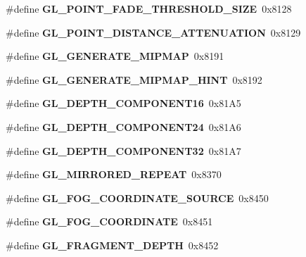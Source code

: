 \begin{DoxyCompactItemize}
\item 
\#define {\bfseries G\+L\+\_\+\+P\+O\+I\+N\+T\+\_\+\+F\+A\+D\+E\+\_\+\+T\+H\+R\+E\+S\+H\+O\+L\+D\+\_\+\+S\+I\+Z\+E}~0x8128\label{_s_d_l__opengl_8h_aea5e5751981b4dbce199bef211d40c77}

\item 
\#define {\bfseries G\+L\+\_\+\+P\+O\+I\+N\+T\+\_\+\+D\+I\+S\+T\+A\+N\+C\+E\+\_\+\+A\+T\+T\+E\+N\+U\+A\+T\+I\+O\+N}~0x8129\label{_s_d_l__opengl_8h_a7ad856733e5bc9530270fb24d52e545b}

\item 
\#define {\bfseries G\+L\+\_\+\+G\+E\+N\+E\+R\+A\+T\+E\+\_\+\+M\+I\+P\+M\+A\+P}~0x8191\label{_s_d_l__opengl_8h_a8d7cd84f0b84e7a77585c8c695f6709f}

\item 
\#define {\bfseries G\+L\+\_\+\+G\+E\+N\+E\+R\+A\+T\+E\+\_\+\+M\+I\+P\+M\+A\+P\+\_\+\+H\+I\+N\+T}~0x8192\label{_s_d_l__opengl_8h_af9d67193f72c666cef8c676456f56a83}

\item 
\#define {\bfseries G\+L\+\_\+\+D\+E\+P\+T\+H\+\_\+\+C\+O\+M\+P\+O\+N\+E\+N\+T16}~0x81\+A5\label{_s_d_l__opengl_8h_a26b057c4fa415d8de41d43990828b0da}

\item 
\#define {\bfseries G\+L\+\_\+\+D\+E\+P\+T\+H\+\_\+\+C\+O\+M\+P\+O\+N\+E\+N\+T24}~0x81\+A6\label{_s_d_l__opengl_8h_ad871b289b8410082db98e4b3af0301f1}

\item 
\#define {\bfseries G\+L\+\_\+\+D\+E\+P\+T\+H\+\_\+\+C\+O\+M\+P\+O\+N\+E\+N\+T32}~0x81\+A7\label{_s_d_l__opengl_8h_a834857c13895c0375a5d2f4f0df7c7ad}

\item 
\#define {\bfseries G\+L\+\_\+\+M\+I\+R\+R\+O\+R\+E\+D\+\_\+\+R\+E\+P\+E\+A\+T}~0x8370\label{_s_d_l__opengl_8h_a05bc3a1fdd98251d126a8946a10f9dc8}

\item 
\#define {\bfseries G\+L\+\_\+\+F\+O\+G\+\_\+\+C\+O\+O\+R\+D\+I\+N\+A\+T\+E\+\_\+\+S\+O\+U\+R\+C\+E}~0x8450\label{_s_d_l__opengl_8h_ab8c54153bac17581605fafd9d973df33}

\item 
\#define {\bfseries G\+L\+\_\+\+F\+O\+G\+\_\+\+C\+O\+O\+R\+D\+I\+N\+A\+T\+E}~0x8451\label{_s_d_l__opengl_8h_aa4c840736b2b88dc9b917ded6105d1b3}

\item 
\#define {\bfseries G\+L\+\_\+\+F\+R\+A\+G\+M\+E\+N\+T\+\_\+\+D\+E\+P\+T\+H}~0x8452\label{_s_d_l__opengl_8h_ae546ff0a0f2123ffb97ad0a3c9bc3448}


\end{DoxyCompactItemize}
